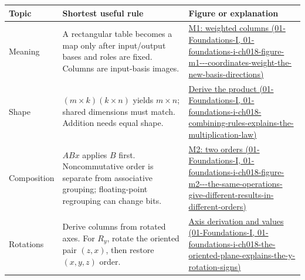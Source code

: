{\def\LTcaptype{none} %
\begin{longtable}[]{@{}
  >{\raggedright\arraybackslash}p{}
  >{\raggedright\arraybackslash}p{}
  >{\raggedright\arraybackslash}p{}@{}}
\toprule\noalign{}
\begin{minipage}[b]{\linewidth}\raggedright
Topic
\end{minipage} & \begin{minipage}[b]{\linewidth}\raggedright
Shortest useful rule
\end{minipage} & \begin{minipage}[b]{\linewidth}\raggedright
Figure or explanation
\end{minipage} \\
\midrule\noalign{}
\endhead
\bottomrule\noalign{}
\endlastfoot
Meaning & A rectangular table becomes a map only after input/output bases and roles are fixed. Columns are input-basis images. & \href{../01-Foundations-I/main.pdf\#nameddest=01-foundations-i-ch018-figure-m1---coordinates-weight-the-new-basis-directions}{M1: weighted columns (01-Foundations-I, 01-foundations-i-ch018-figure-m1-\/-\/-coordinates-weight-the-new-basis-directions)} \\
Shape & \((m\times k)(k\times n)\) yields \(m\times n\); shared dimensions must match. Addition needs equal shape. & \href{../01-Foundations-I/main.pdf\#nameddest=01-foundations-i-ch018-combining-rules-explains-the-multiplication-law}{Derive the product (01-Foundations-I, 01-foundations-i-ch018-combining-rules-explains-the-multiplication-law)} \\
Composition & \(ABx\) applies \(B\) first. Noncommutative order is separate from associative grouping; floating-point regrouping can change bits. & \href{../01-Foundations-I/main.pdf\#nameddest=01-foundations-i-ch018-figure-m2---the-same-operations-give-different-results-in-different-orders}{M2: two orders (01-Foundations-I, 01-foundations-i-ch018-figure-m2-\/-\/-the-same-operations-give-different-results-in-different-orders)} \\
Rotations & Derive columns from rotated axes. For \(R_y\), rotate the oriented pair \((z,x)\), then restore \((x,y,z)\) order. & \href{../01-Foundations-I/main.pdf\#nameddest=01-foundations-i-ch018-the-oriented-plane-explains-the-y-rotation-signs}{Axis derivation and values (01-Foundations-I, 01-foundations-i-ch018-the-oriented-plane-explains-the-y-rotation-signs)} \\

\end{longtable}}
